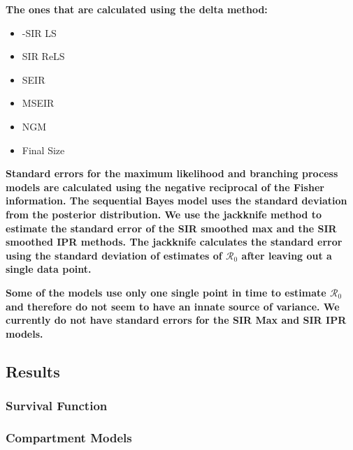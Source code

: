 \documentclass[12pt]{article}
\newcommand{\rr}{\ensuremath{\mathcal{R}_0}}
\begin{document}
\textbf{The ones that are calculated using the delta method:}
	
	\begin{itemize}
		\item-SIR LS
		\item SIR ReLS
		\item SEIR
		\item MSEIR
		\item NGM
		\item Final Size
	\end{itemize}
	

\textbf{Standard errors for the maximum likelihood and branching process models are calculated using the negative reciprocal of the Fisher information. The sequential Bayes model uses the standard deviation from the posterior distribution. We use the jackknife method to estimate the standard error of the SIR smoothed max and the SIR smoothed IPR methods. The jackknife calculates the standard error using the standard deviation of estimates of $\rr$ after leaving out a single data point.}
	
\textbf{Some of the models use only one single point in time to estimate $\rr$ and therefore do not seem to have an innate source of variance. We currently do not have standard errors for the SIR Max and SIR IPR models.}

\subsection{Results}

\subsubsection{Survival Function}



\subsubsection{Compartment Models}
\end{document}
